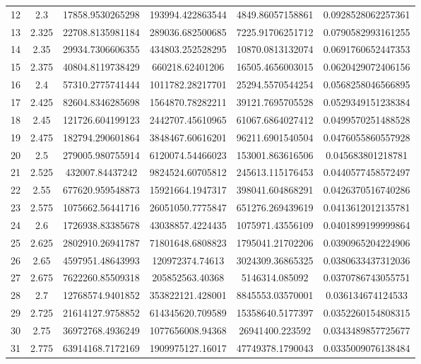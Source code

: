 \documentclass{article}
\begin{document}
\begin{table}
\begin{tabular}{S[table-format=2] S[table-format=1.3] S[table-format=11] S[table-format=12] S[table-format=11] S[table-format=1.9]}
12 & 2.3 & 17858.9530265298 & 193994.422863544 & 4849.86057158861 & 0.0928528062257361 \\
13 & 2.325 & 22708.8135981184 & 289036.682500685 & 7225.91706251712 & 0.0790582993161255 \\
14 & 2.35 & 29934.7306606355 & 434803.252528295 & 10870.0813132074 & 0.0691760652447353 \\
15 & 2.375 & 40804.8119738429 & 660218.62401206 & 16505.4656003015 & 0.0620429072406156 \\
16 & 2.4 & 57310.2775741444 & 1011782.28217701 & 25294.5570544254 & 0.0568258046566895 \\
17 & 2.425 & 82604.8346285698 & 1564870.78282211 & 39121.7695705528 & 0.0529349151238384 \\
18 & 2.45 & 121726.604199123 & 2442707.45610965 & 61067.6864027412 & 0.0499570251488528 \\
19 & 2.475 & 182794.290601864 & 3848467.60616201 & 96211.6901540504 & 0.0476055860557928 \\
20 & 2.5 & 279005.980755914 & 6120074.54466023 & 153001.863616506 & 0.045683801218781 \\
21 & 2.525 & 432007.84437242 & 9824524.60705812 & 245613.115176453 & 0.0440577458572497 \\
22 & 2.55 & 677620.959548873 & 15921664.1947317 & 398041.604868291 & 0.0426370516740286 \\
23 & 2.575 & 1075662.56441716 & 26051050.7775847 & 651276.269439619 & 0.0413612012135781 \\
24 & 2.6 & 1726938.83385678 & 43038857.4224435 & 1075971.43556109 & 0.0401899199999864 \\
25 & 2.625 & 2802910.26941787 & 71801648.6808823 & 1795041.21702206 & 0.0390965204224906 \\
26 & 2.65 & 4597951.48643993 & 120972374.74613 & 3024309.36865325 & 0.0380633437312036 \\
27 & 2.675 & 7622260.85509318 & 205852563.40368 & 5146314.085092 & 0.0370786743055751 \\
28 & 2.7 & 12768574.9401852 & 353822121.428001 & 8845553.03570001 & 0.036134674124533 \\
29 & 2.725 & 21614127.9758852 & 614345620.709589 & 15358640.5177397 & 0.0352260154808315 \\
30 & 2.75 & 36972768.4936249 & 1077656008.94368 & 26941400.223592 & 0.0343489857725677 \\
31 & 2.775 & 63914168.7172169 & 1909975127.16017 & 47749378.1790043 & 0.0335009076138484 \\

\end{tabular}
\end{table}
\end{document}
